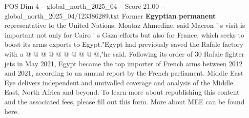 \begin{textsample}{POS Dim 4 – global\_north\_2025\_04 – Score 21.00 – global\_north\_2025\_04/123386289.txt}
Former \textbf{Egyptian} \textbf{permanent} representative to the United Nations, Moataz Ahmedine, said Macron ' s visit is important not only for Cairo ' s Gaza efforts but also for France, which seeks to boost its arms exports to Egypt."Egypt had previously saved the Rafale factory with a @ @ @ @ @ @ @ @ @ @,"he said.
Following its order of 30 Rafale fighter jets in May 2021, Egypt became the top importer of French arms between 2012 and 2021, according to an annual report by the French parliament.
Middle East Eye delivers independent and unrivalled coverage and analysis of the Middle East, North Africa and beyond.
To learn more about republishing this content and the associated fees, please fill out this form.
More about MEE can be found here.

\end{textsample}
